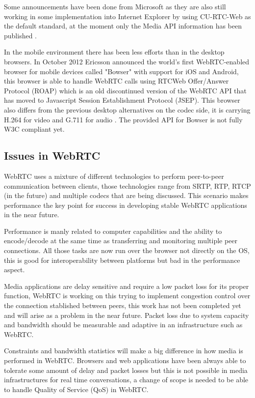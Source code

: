 Some announcements have been done from Microsoft as they are also still working in some implementation into Internet Explorer by using CU-RTC-Web as the default standard, at the moment only the Media API information has been published \cite{microsoftcapture}.

In the mobile environment there has been less efforts than in the desktop browsers. In October 2012 Ericsson announced the world's first WebRTC-enabled browser for mobile devices called "Bowser" with support for iOS and Android, this browser is able to handle WebRTC calls using RTCWeb Offer/Answer Protocol (ROAP) which is an old discontinued version of the WebRTC API that has moved to Javascript Session Establishment Protocol (JSEP). This browser also differs from the previous desktop alternatives on the codec side, it is carrying H.264 for video and G.711 for audio \cite{ericssonbowser}. The provided API for Bowser is not fully W3C compliant yet.

\subsection{Issues in WebRTC}

WebRTC uses a mixture of different technologies to perform peer-to-peer communication between clients, those technologies range from SRTP, RTP, RTCP (in the future) and multiple codecs that are being discussed. This scenario makes performance the key point for success in developing stable WebRTC applications in the near future. 

Performance is manly related to computer capabilities and the ability to encode/decode at the same time as transferring and monitoring multiple peer connections. All those tasks are now run over the browser not directly on the OS, this is good for interoperability between platforms but bad in the performance aspect. 

Media applications are delay sensitive and require a low packet loss for its proper function, WebRTC is working on this trying to implement congestion control over the connection stablished between peers, this work has not been completed yet and will arise as a problem in the near future. Packet loss due to system capacity and bandwidth should be measurable and adaptive in an infrastructure such as WebRTC.

Constraints and bandwidth statistics will make a big difference in how media is performed in WebRTC. Browsers and web applications have been always able to tolerate some amount of delay and packet losses but this is not possible in media infrastructures for real time conversations, a change of scope is needed to be able to handle Quality of Service (QoS) in WebRTC.

